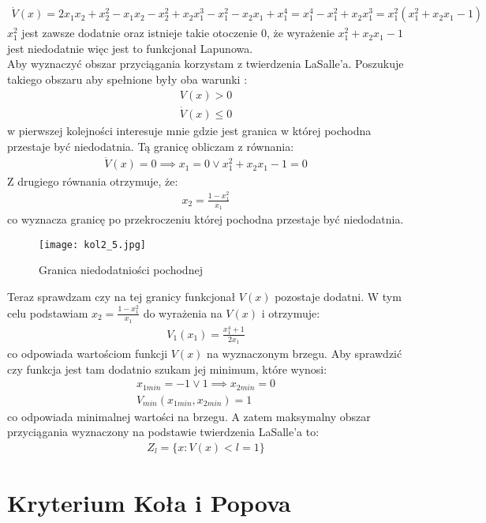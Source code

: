\documentclass[a4paper,11pt]{article}
\begin{document}
\begin{align*}
\dot{V}(x) = 2x_{1}x_{2}+x_{2}^{2}-x_{1}x_{2}-x_{2}^{2}+x_{2}x_{1}^{3}-x_{1}^{2}-x_{2}x_{1}+x_{1}^{4} = x_{1}^{4}-x_{1}^{2}+x_{2}x_{1}^{3}=x_{1}^{2}(x_{1}^{2}+x_{2}x_{1}-1)
\end{align*}
\( x_{1}^{2} \) jest zawsze dodatnie oraz istnieje takie otoczenie 0, że wyrażenie \( x_{1}^{2}+x_{2}x_{1} - 1 \) jest niedodatnie więc jest to funkcjonał Lapunowa. \\
Aby wyznaczyć obszar przyciągania korzystam z twierdzenia LaSalle'a. Poszukuje takiego obszaru aby spełnione były oba warunki : 
\begin{align*}
V(x) > 0 \\
\dot{V}(x) \leq 0
\end{align*}
w pierwszej kolejności interesuje mnie gdzie jest granica w której pochodna przestaje być niedodatnia. Tą granicę obliczam z równania:
\begin{align*}
\dot{V}(x)=0 \implies x_{1} = 0 \lor x_{1}^{2}+x_{2}x_{1}-1=0
\end{align*}
Z drugiego równania otrzymuje, że:
\begin{align*}
x_{2}=\frac{1-x_{1}^{2}}{x_{1}}
\end{align*}
co wyznacza granicę po przekroczeniu której pochodna przestaje być niedodatnia.
\begin{figure}[H]
\centerline{\texttt{[image: kol2\_5.jpg]}}
\caption{Granica niedodatniości pochodnej}
\label{fig:kol2_5}
\end{figure}
Teraz sprawdzam czy na tej granicy funkcjonał \( V(x) \) pozostaje dodatni. W tym celu podstawiam \( x_{2} = \frac{1-x_{1}^{2}}{x_{1}}  \) do wyrażenia na \( V(x) \) i otrzymuje: 
\begin{align*}
V_{1}(x_{1})=\frac{x_{1}^{4}+1}{2x_{1}}
\end{align*}
co odpowiada wartościom funkcji \(V(x)\) na wyznaczonym brzegu. Aby sprawdzić czy funkcja jest tam dodatnio szukam jej minimum, które wynosi:
\begin{align*}
x_{1min}=-1 \lor 1 \implies x_{2min} = 0 \\
V_{min}( x_{1min} , x_{2min} )=1 
\end{align*}
co odpowiada minimalnej wartości na brzegu. A zatem maksymalny obszar przyciągania wyznaczony na podstawie twierdzenia LaSalle'a to:
\begin{align*}
Z_{l} = \{ x: V(x)<l=1 \}
\end{align*}


\newpage
\section{Kryterium Koła i Popova}
\end{document}
